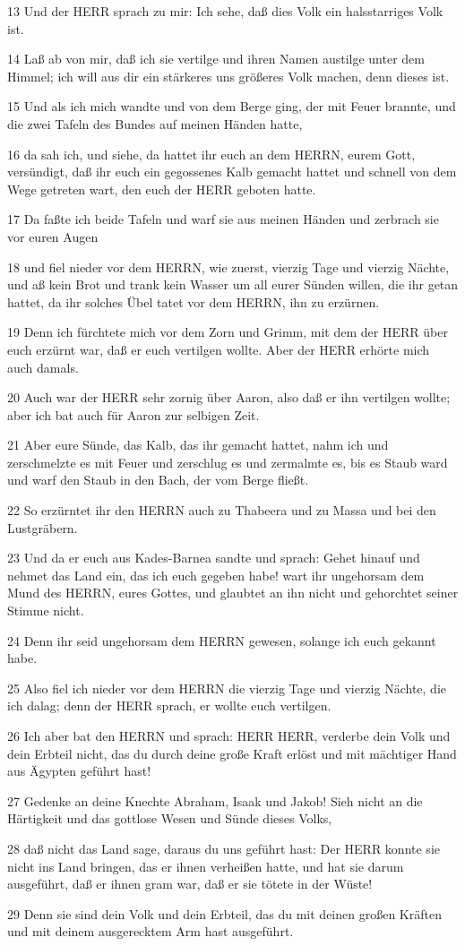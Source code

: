 \par 13 Und der HERR sprach zu mir: Ich sehe, daß dies Volk ein halsstarriges Volk ist.
\par 14 Laß ab von mir, daß ich sie vertilge und ihren Namen austilge unter dem Himmel; ich will aus dir ein stärkeres uns größeres Volk machen, denn dieses ist.
\par 15 Und als ich mich wandte und von dem Berge ging, der mit Feuer brannte, und die zwei Tafeln des Bundes auf meinen Händen hatte,
\par 16 da sah ich, und siehe, da hattet ihr euch an dem HERRN, eurem Gott, versündigt, daß ihr euch ein gegossenes Kalb gemacht hattet und schnell von dem Wege getreten wart, den euch der HERR geboten hatte.
\par 17 Da faßte ich beide Tafeln und warf sie aus meinen Händen und zerbrach sie vor euren Augen
\par 18 und fiel nieder vor dem HERRN, wie zuerst, vierzig Tage und vierzig Nächte, und aß kein Brot und trank kein Wasser um all eurer Sünden willen, die ihr getan hattet, da ihr solches Übel tatet vor dem HERRN, ihn zu erzürnen.
\par 19 Denn ich fürchtete mich vor dem Zorn und Grimm, mit dem der HERR über euch erzürnt war, daß er euch vertilgen wollte. Aber der HERR erhörte mich auch damals.
\par 20 Auch war der HERR sehr zornig über Aaron, also daß er ihn vertilgen wollte; aber ich bat auch für Aaron zur selbigen Zeit.
\par 21 Aber eure Sünde, das Kalb, das ihr gemacht hattet, nahm ich und zerschmelzte es mit Feuer und zerschlug es und zermalmte es, bis es Staub ward und warf den Staub in den Bach, der vom Berge fließt.
\par 22 So erzürntet ihr den HERRN auch zu Thabeera und zu Massa und bei den Lustgräbern.
\par 23 Und da er euch aus Kades-Barnea sandte und sprach: Gehet hinauf und nehmet das Land ein, das ich euch gegeben habe! wart ihr ungehorsam dem Mund des HERRN, eures Gottes, und glaubtet an ihn nicht und gehorchtet seiner Stimme nicht.
\par 24 Denn ihr seid ungehorsam dem HERRN gewesen, solange ich euch gekannt habe.
\par 25 Also fiel ich nieder vor dem HERRN die vierzig Tage und vierzig Nächte, die ich dalag; denn der HERR sprach, er wollte euch vertilgen.
\par 26 Ich aber bat den HERRN und sprach: HERR HERR, verderbe dein Volk und dein Erbteil nicht, das du durch deine große Kraft erlöst und mit mächtiger Hand aus Ägypten geführt hast!
\par 27 Gedenke an deine Knechte Abraham, Isaak und Jakob! Sieh nicht an die Härtigkeit und das gottlose Wesen und Sünde dieses Volks,
\par 28 daß nicht das Land sage, daraus du uns geführt hast: Der HERR konnte sie nicht ins Land bringen, das er ihnen verheißen hatte, und hat sie darum ausgeführt, daß er ihnen gram war, daß er sie tötete in der Wüste!
\par 29 Denn sie sind dein Volk und dein Erbteil, das du mit deinen großen Kräften und mit deinem ausgerecktem Arm hast ausgeführt.

